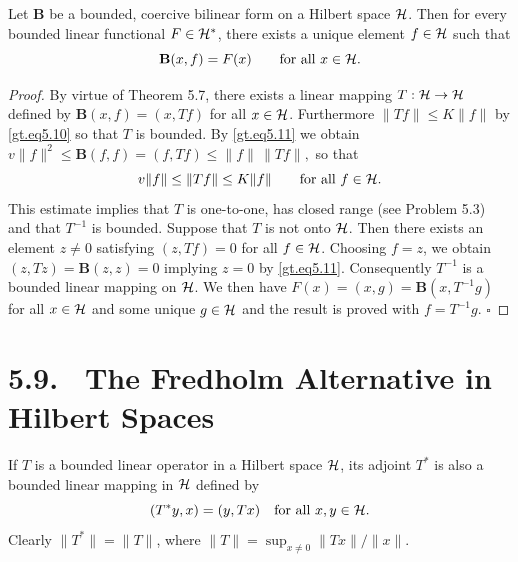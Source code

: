 \begin{theorem}\label{gt.thm5.8}
Let $\mathbf{B}$ be a bounded, coercive bilinear form on a Hilbert space $\Hilb$. Then for every bounded linear functional $F\in \Hilb^*$, there exists a unique element $f\in \Hilb$ such that
\[
\mathbf{B}(x,f)=F(x)\qquad \text{for all $x\in \Hilb$.}
\]
\end{theorem}

\begin{proof}
By virtue of Theorem 5.7, there exists a linear mapping $T:\Hilb\to\Hilb$ defined by $\mathbf{B}(x,f)=(x,Tf)$ for all $x\in \Hilb$. Furthermore $\|Tf\|\le K\|f\|$ by \eqref{gt.eq5.10} so that $T$ is bounded. By \eqref{gt.eq5.11} we obtain $v\|f\|^2\le \mathbf{B}(f,f)=(f,Tf)\le \|f\|\,\|Tf\|,$ so that
\[
v\|f\|\le \|Tf\|\le K\|f\| \qquad \text{for all } f\in \Hilb.
\]
This estimate implies that $T$ is one-to-one, has closed range (see Problem 5.3) and that $T^{-1}$ is bounded. Suppose that $T$ is not onto $\Hilb$. Then there exists an element $z\ne 0$ satisfying $(z,Tf)=0$ for all $f\in \Hilb$. Choosing $f=z$, we obtain $(z,Tz)=\mathbf{B}(z,z)=0$ implying $z=0$ by \eqref{gt.eq5.11}. Consequently $T^{-1}$ is a bounded linear mapping on $\Hilb$. We then have $F(x)=(x,g)=\mathbf{B}(x,T^{-1}g)$ for all $x\in \Hilb$ and some unique $g\in \Hilb$ and the result is proved with $f=T^{-1}g$. $\square$
\end{proof}

\section*{5.9. \ The Fredholm Alternative in Hilbert Spaces}

\begin{definition}\label{gt.def5.9.adjoint-hilbert}
If $T$ is a bounded linear operator in a Hilbert space $\Hspace$, its adjoint $T^*$ is also a bounded linear mapping in $\Hspace$ defined by
\begin{equation}\label{gt.eq5.12}\dcref{(5.12)}\group{chapter-5}\source{gilbarg-trudinger:page-0096}
(T^*y,x)=(y,Tx) \quad \text{for all } x,y \in \Hspace.
\end{equation}
Clearly $\|T^*\|=\|T\|$, where $\|T\|=\sup_{x\neq 0}\|Tx\|/\|x\|$.
\end{definition}

